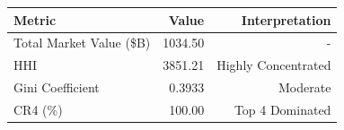 

\begin{tabular}{@{}lrr@{}}
\toprule
Metric & Value & Interpretation \\
\midrule
Total Market Value (\$B) & 1034.50 & - \\
HHI & 3851.21 & Highly Concentrated \\
Gini Coefficient & 0.3933 & Moderate \\
CR4 (\%) & 100.00 & Top 4 Dominated \\
\bottomrule
\end{tabular}